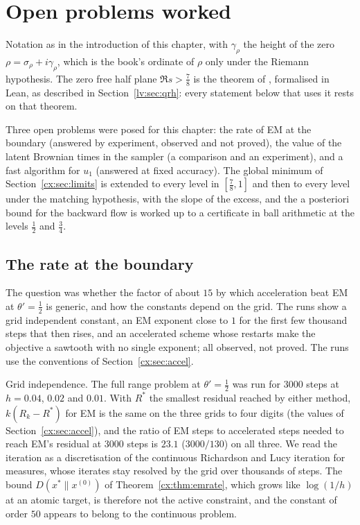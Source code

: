 \section{Open problems worked}\label{cx:sec:worked}

Notation as in the introduction of this chapter, with $\gamma_\rho$ the height of the zero $\rho=\sigma_\rho+i\gamma_\rho$, which is the book's ordinate of $\rho$ only under the Riemann hypothesis. The zero free half plane $\Re s>\tfrac78$ is the theorem of \cite{OAI26a}, formalised in Lean, as described in Section~\ref{lv:sec:qrh}: every statement below that uses it rests on that theorem.

Three open problems were posed for this chapter: the rate of EM at the boundary (answered by experiment, observed and not proved), the value of the latent Brownian times in the sampler (a comparison and an experiment), and a fast algorithm for $u_1$ (answered at fixed accuracy). The global minimum of Section~\ref{cx:sec:limits} is extended to every level in $[\tfrac78,1]$ and then to every level under the matching hypothesis, with the slope of the excess, and the a posteriori bound for the backward flow is worked up to a certificate in ball arithmetic at the levels $\tfrac12$ and $\tfrac34$.

\subsection{The rate at the boundary}\label{cx:sec:rateworked}

The question was whether the factor of about $15$ by which acceleration beat EM at $\theta'=\tfrac12$ is generic, and how the constants depend on the grid. The runs show a grid independent constant, an EM exponent close to $1$ for the first few thousand steps that then rises, and an accelerated scheme whose restarts make the objective a sawtooth with no single exponent; all observed, not proved. The runs use the conventions of Section~\ref{cx:sec:accel}.

Grid independence. The full range problem at $\theta'=\tfrac12$ was run for $3000$ steps at $h=0.04$, $0.02$ and $0.01$. With $R^*$ the smallest residual reached by either method, $k(R_k-R^*)$ for EM is the same on the three grids to four digits (the values of Section~\ref{cx:sec:accel}), and the ratio of EM steps to accelerated steps needed to reach EM's residual at $3000$ steps is $23.1$ ($3000/130$) on all three. We read the iteration as a discretisation of the continuous Richardson and Lucy iteration for measures, whose iterates stay resolved by the grid over thousands of steps. The bound $D(x^*\|x^{(0)})$ of Theorem~\ref{cx:thm:emrate}, which grows like $\log(1/h)$ at an atomic target, is therefore not the active constraint, and the constant of order $50$ appears to belong to the continuous problem.


